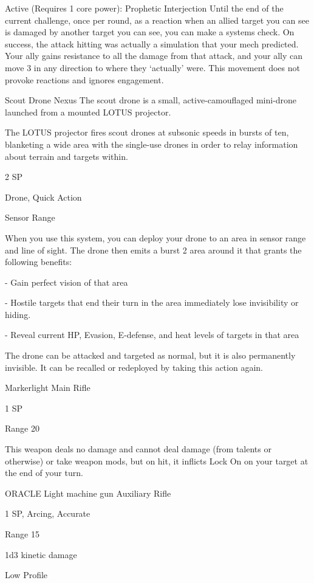   Active (Requires 1 core power): Prophetic Interjection
  Until the end of the current challenge, once per round, as a reaction when an allied target you can see
  is damaged by another target you can see, you can make a systems check. On success, the attack
  hitting was actually a simulation that your mech predicted. Your ally gains resistance to all the damage
  from that attack, and your ally can move 3 in any direction to where they ‘actually’ were. This
  movement does not provoke reactions and ignores engagement.

Scout Drone Nexus
The scout drone is a small, active-camouflaged mini-drone launched from a mounted LOTUS projector.

The LOTUS projector fires scout drones at subsonic speeds in bursts of ten, blanketing a wide area with
the single-use drones in order to relay information about terrain and targets within.

2 SP

Drone, Quick Action





Sensor Range

When you use this system, you can deploy your drone to an area in sensor range and line of
sight. The drone then emits a burst 2 area around it that grants the following benefits:

  - Gain perfect vision of that area

  - Hostile targets that end their turn in the area immediately lose invisibility or hiding.

  - Reveal current HP, Evasion, E-defense, and heat levels of targets in that area

The drone can be attacked and targeted as normal, but it is also permanently invisible. It can be
recalled or redeployed by taking this action again.


Markerlight
Main Rifle

1 SP

Range 20


This weapon deals no damage and cannot deal damage (from talents or otherwise) or take
weapon mods, but on hit, it inflicts Lock On on your target at the end of your turn.


ORACLE Light machine gun
Auxiliary Rifle

1 SP, Arcing, Accurate

Range 15

1d3 kinetic damage


Low Profile

